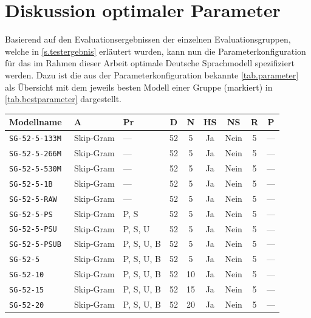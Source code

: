 \section{Diskussion optimaler Parameter}\label{s.parameterspezifikation}
Basierend auf den Evaluationsergebnissen der einzelnen Evaluationsgruppen, welche in \autoref{s.testergebnis} erläutert wurden, kann nun die Parameterkonfiguration für das im Rahmen dieser Arbeit optimale Deutsche Sprachmodell spezifiziert werden. Dazu ist die aus der Parameterkonfiguration bekannte \autoref{tab.parameter} als Übersicht mit dem jeweils besten Modell einer Gruppe (markiert) in \autoref{tab.bestparameter} dargestellt.

\begin{table}[!ht]\vspace{1ex}\small\centering{}\begin{tabular}{|l|l|l|c|c|c|c|c|c|}
\hline Modellname & A         & Pr         & D   & N  & HS   & NS   & R  & P \\ \hline\hline
\tt{SG-52-5-133M} & Skip-Gram & ---        & 52  & 5  & Ja   & Nein & 5  & ---    \\ \hline
\tt{SG-52-5-266M} & Skip-Gram & ---        & 52  & 5  & Ja   & Nein & 5  & ---    \\ \hline
\tt{SG-52-5-530M} & Skip-Gram & ---        & 52  & 5  & Ja   & Nein & 5  & ---    \\ \hline\rowcolor{lightgreen}
\tt{SG-52-5-1B}   & Skip-Gram & ---        & 52  & 5  & Ja   & Nein & 5  & ---    \\ \hline\hline
\tt{SG-52-5-RAW}  & Skip-Gram & ---        & 52  & 5  & Ja   & Nein & 5  & ---    \\ \hline
\tt{SG-52-5-PS}   & Skip-Gram & P, S       & 52  & 5  & Ja   & Nein & 5  & ---    \\ \hline
\tt{SG-52-5-PSU}  & Skip-Gram & P, S, U    & 52  & 5  & Ja   & Nein & 5  & ---    \\ \hline\rowcolor{lightgreen}
\tt{SG-52-5-PSUB} & Skip-Gram & P, S, U, B & 52  & 5  & Ja   & Nein & 5  & ---    \\ \hline\hline\rowcolor{lightgreen}
\tt{SG-52-5}      & Skip-Gram & P, S, U, B & 52  & 5  & Ja   & Nein & 5  & ---    \\ \hline
\tt{SG-52-10}     & Skip-Gram & P, S, U, B & 52  & 10 & Ja   & Nein & 5  & ---    \\ \hline
\tt{SG-52-15}     & Skip-Gram & P, S, U, B & 52  & 15 & Ja   & Nein & 5  & ---    \\ \hline
\tt{SG-52-20}     & Skip-Gram & P, S, U, B & 52  & 20 & Ja   & Nein & 5  & ---    \\ \hline\hline

\end{tabular}
\end{table}
